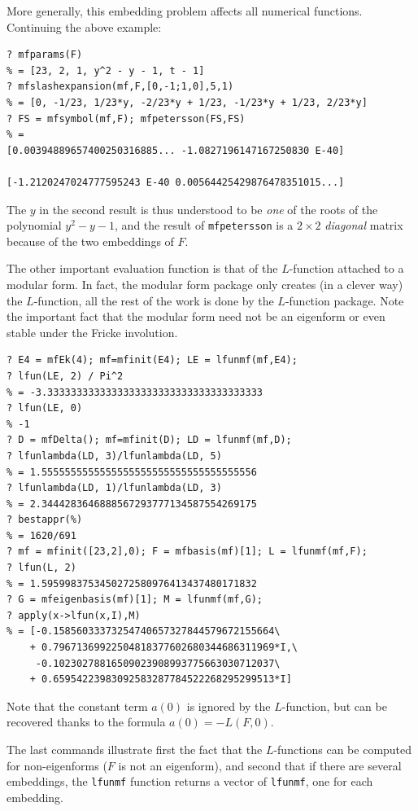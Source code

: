 \documentclass[11pt]{article}
\def\kbd#1{{\tt #1}}
\begin{document}
  More generally, this embedding problem affects all numerical functions.
  Continuing the above example:

\begin{verbatim}
? mfparams(F)
% = [23, 2, 1, y^2 - y - 1, t - 1]
? mfslashexpansion(mf,F,[0,-1;1,0],5,1)
% = [0, -1/23, 1/23*y, -2/23*y + 1/23, -1/23*y + 1/23, 2/23*y]
? FS = mfsymbol(mf,F); mfpetersson(FS,FS)
% =
[0.00394889657400250316885... -1.0827196147167250830 E-40]

[-1.2120247024777595243 E-40 0.00564425429876478351015...]
\end{verbatim}

  The $y$ in the second result is thus understood to be \emph{one} of
  the roots of the polynomial $y^2-y-1$, and the result of \kbd{mfpetersson}
  is a $2\times 2$ \emph{diagonal} matrix because of the two embeddings of $F$.

  \smallskip

  The other important evaluation function is that of the $L$-function
  attached to a modular form. In fact, the modular form package only
  creates (in a clever way) the $L$-function, all the rest of the work
  is done by the $L$-function package. Note the important fact that
  the modular form need not be an eigenform or even stable under the
  Fricke involution.

\begin{verbatim}
? E4 = mfEk(4); mf=mfinit(E4); LE = lfunmf(mf,E4);
? lfun(LE, 2) / Pi^2
% = -3.3333333333333333333333333333333333333
? lfun(LE, 0)
% -1
? D = mfDelta(); mf=mfinit(D); LD = lfunmf(mf,D);
? lfunlambda(LD, 3)/lfunlambda(LD, 5)
% = 1.5555555555555555555555555555555555556
? lfunlambda(LD, 1)/lfunlambda(LD, 3)
% = 2.3444283646888567293777134587554269175
? bestappr(%)
% = 1620/691
? mf = mfinit([23,2],0); F = mfbasis(mf)[1]; L = lfunmf(mf,F);
? lfun(L, 2)
% = 1.5959983753450272580976413437480171832
? G = mfeigenbasis(mf)[1]; M = lfunmf(mf,G);
? apply(x->lfun(x,I),M)
% = [-0.15856033373254740657327844579672155664\
    + 0.79671369922504818377602680344686311969*I,\
     -0.10230278816509023908993775663030712037\
    + 0.65954223983092583287784522268295299513*I]
\end{verbatim}

  Note that the constant term $a(0)$ is ignored by the $L$-function, but
  can be recovered thanks to the formula $a(0)=-L(F,0)$.

  The last commands illustrate first the fact that the $L$-functions can be
  computed for non-eigenforms ($F$ is not an eigenform), and second that
  if there are several embeddings, the \kbd{lfunmf} function returns a
  vector of \kbd{lfunmf}, one for each embedding.
\end{document}
